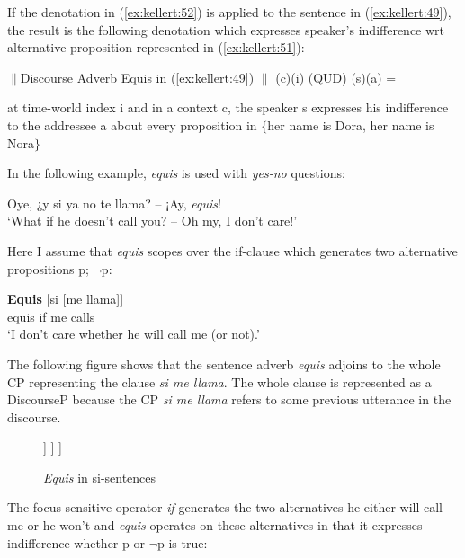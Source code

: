 \documentclass[output=paper]{langsci/langscibook}
\begin{document}
If the denotation in (\ref{ex:kellert:52}) is applied to the sentence in (\ref{ex:kellert:49}), the result is the following denotation which expresses speaker’s indifference wrt alternative proposition represented in (\ref{ex:kellert:51}):

\ea\label{ex:kellert:53} $\parallel$Discourse Adverb Equis in (\ref{ex:kellert:49}) $\parallel$ (c)(i) (QUD) (s)(a) =\par
at time-world index i and in a context c, the speaker s expresses his indifference to the addressee a about every proposition in $\lbrace$her name is Dora, her name is Nora$\rbrace$
\z

In the following example, \textit{equis} is used with \textit{yes-no} questions:

\ea\label{ex:kellert:54}
Oye, {¿}y si ya no te llama? – {¡}Ay, \textit{equis}!\\
\glt ‘What if he doesn’t call you? – Oh my, I don’t care!’
\z

Here I assume that \textit{equis} scopes over the if-clause which generates two alternative propositions {p; $¬$p}:

\ea\label{ex:kellert:55}
\gll \textbf{Equis} [si [me llama]]\\
equis if me calls\\
\glt ‘I don’t care whether he will call me (or not).’
\z

The following figure shows that the sentence adverb \textit{equis} adjoins to the whole CP representing the clause \textit{si me llama}. The whole clause is represented as a DiscourseP because the CP \textit{si me llama} refers to some previous utterance in the discourse.


\begin{figure}
	\caption{\textit{Equis} in si-sentences\label{fig:kellert:tree3}}
	\begin{forest}
		[DiscourseP
			[\textit{Equis}] [CP
				[C\textsuperscript{0}\\\textit{si}][TP
				[\textit{me llama},roof]
		    	]
			]
		]
	\end{forest}
\end{figure}

The focus sensitive operator \textit{if} generates the two alternatives he either will call me or he won’t and \textit{equis} operates on these alternatives in that it expresses indifference whether p or $¬$p is true:
\end{document}
